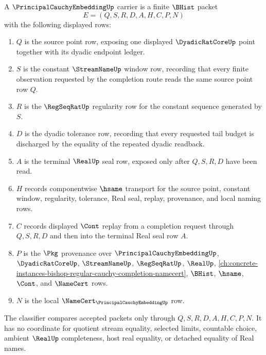 \begin{definition}
\label{def:principal-cauchy-embedding-carrier}
A $\PrincipalCauchyEmbeddingUp$ carrier is a finite $\BHist$ packet
$$
E=(Q,S,R,D,A,H,C,P,N)
$$
with the following displayed rows:
\begin{enumerate}
\item $Q$ is the source point row, exposing one displayed $\DyadicRatCoreUp$ point together with its dyadic endpoint ledger.
\item $S$ is the constant $\StreamNameUp$ window row, recording that every finite observation requested by the completion route reads the same source point row $Q$.
\item $R$ is the $\RegSeqRatUp$ regularity row for the constant sequence generated by $S$.
\item $D$ is the dyadic tolerance row, recording that every requested tail budget is discharged by the equality of the repeated dyadic readback.
\item $A$ is the terminal $\RealUp$ seal row, exposed only after $Q,S,R,D$ have been read.
\item $H$ records componentwise $\hsame$ transport for the source point, constant window, regularity, tolerance, Real seal, replay, provenance, and local naming rows.
\item $C$ records displayed $\Cont$ replay from a completion request through $Q,S,R,D$ and then into the terminal Real seal row $A$.
\item $P$ is the $\Pkg$ provenance over $\PrincipalCauchyEmbeddingUp$, $\DyadicRatCoreUp$, $\StreamNameUp$, $\RegSeqRatUp$, $\RealUp$, \autoref{ch:concrete-instances-bishop-regular-cauchy-completion-namecert}, $\BHist$, $\hsame$, $\Cont$, and $\NameCert$ rows.
\item $N$ is the local $\NameCert_{\PrincipalCauchyEmbeddingUp}$ row.
\end{enumerate}
The classifier compares accepted packets only through $Q,S,R,D,A,H,C,P,N$. It has no coordinate for quotient stream equality, selected limits, countable choice, ambient $\RealUp$ completeness, host real equality, or detached equality of Real names.
\end{definition}

